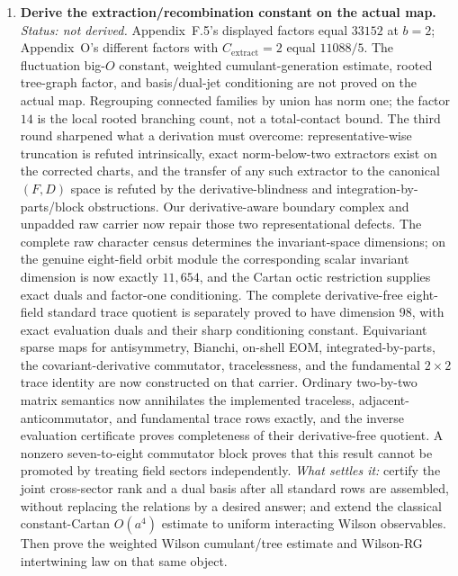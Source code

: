 \documentclass[11pt]{article}
\theoremstyle{definition}
\begin{document}
\begin{enumerate}
  \item \textbf{Derive the extraction/recombination constant on the actual map.}
    \emph{Status: not derived.} Appendix~F.5's displayed factors equal $33152$
    at $b=2$; Appendix~O's different factors with
    $C_{\mathrm{extract}}=2$ equal $11088/5$. The fluctuation big-$O$ constant,
    weighted cumulant-generation estimate, rooted tree-graph factor, and
    basis/dual-jet conditioning are not proved on the actual map. Regrouping
    connected families by union has norm one; the factor $14$ is the local
    rooted branching count, not a total-contact bound. The third round
    sharpened what a derivation must overcome: representative-wise truncation
    is refuted intrinsically, exact norm-below-two extractors exist on the
    corrected charts, and the transfer of any such extractor to the canonical
    $(F,D)$ space is refuted by the derivative-blindness and
    integration-by-parts/block obstructions. Our derivative-aware boundary
    complex and unpadded raw carrier now repair those two representational
    defects. The complete raw character census determines the invariant-space
    dimensions; on the genuine eight-field orbit module the corresponding
    scalar invariant dimension is now exactly $11{,}654$, and the Cartan
    octic restriction supplies exact duals and factor-one conditioning.
    The complete derivative-free eight-field standard trace quotient is
    separately proved to have dimension $98$, with exact evaluation duals and
    their sharp conditioning constant.  Equivariant sparse maps for
    antisymmetry, Bianchi,
    on-shell EOM, integrated-by-parts, the covariant-derivative commutator,
    tracelessness, and the fundamental $2\times2$ trace identity are now
    constructed on that carrier.  Ordinary two-by-two matrix semantics now
    annihilates the implemented traceless, adjacent-anticommutator, and
    fundamental trace rows exactly, and the inverse evaluation certificate
    proves completeness of their derivative-free quotient.  A nonzero
    seven-to-eight commutator block proves that this result cannot be promoted
    by treating field sectors independently.  \emph{What settles it:} certify
    the joint cross-sector rank and a dual basis after all standard rows are
    assembled, without replacing the relations by a desired answer; and
    extend the classical
    constant-Cartan $O(a^4)$ estimate to uniform interacting Wilson
    observables. Then prove the weighted Wilson
    cumulant/tree estimate and Wilson-RG intertwining law on that same object.

\end{enumerate}
\end{document}
